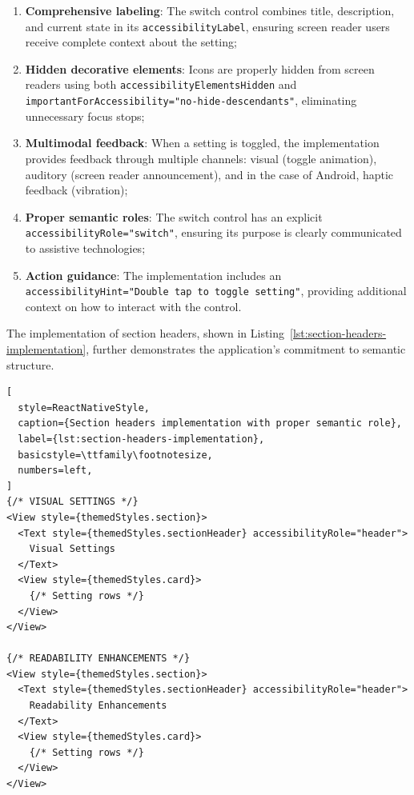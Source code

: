 \begin{enumerate}
    \item \textbf{Comprehensive labeling}: The switch control combines title, description, and current state in its \texttt{accessibilityLabel}, ensuring screen reader users receive complete context about the setting;
    
    \item \textbf{Hidden decorative elements}: Icons are properly hidden from screen readers using both \texttt{accessibilityElementsHidden} and \\ \texttt{importantForAccessibility="no-hide-descendants"}, eliminating unnecessary focus stops;
    
    \item \textbf{Multimodal feedback}: When a setting is toggled, the implementation provides feedback through multiple channels: visual (toggle animation), auditory (screen reader announcement), and in the case of Android, haptic feedback (vibration);
    
    \item \textbf{Proper semantic roles}: The switch control has an explicit \texttt{accessibilityRole="switch"}, ensuring its purpose is clearly communicated to assistive technologies;
    
    \item \textbf{Action guidance}: The implementation includes an \texttt{accessibilityHint="Double tap to toggle setting"}, providing additional context on how to interact with the control.
\end{enumerate}

The implementation of section headers, shown in Listing~\ref{lst:section-headers-implementation}, further demonstrates the application's commitment to semantic structure.

\begin{lstlisting}[
  style=ReactNativeStyle,
  caption={Section headers implementation with proper semantic role},
  label={lst:section-headers-implementation},
  basicstyle=\ttfamily\footnotesize,
  numbers=left,
]
{/* VISUAL SETTINGS */}
<View style={themedStyles.section}>
  <Text style={themedStyles.sectionHeader} accessibilityRole="header">
    Visual Settings
  </Text>
  <View style={themedStyles.card}>
    {/* Setting rows */}
  </View>
</View>

{/* READABILITY ENHANCEMENTS */}
<View style={themedStyles.section}>
  <Text style={themedStyles.sectionHeader} accessibilityRole="header">
    Readability Enhancements
  </Text>
  <View style={themedStyles.card}>
    {/* Setting rows */}
  </View>
</View>
\end{lstlisting}

